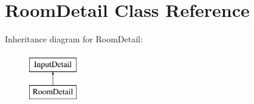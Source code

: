\hypertarget{classRoomDetail}{\section{Room\-Detail Class Reference}
\label{classRoomDetail}
}
Inheritance diagram for Room\-Detail\-:\begin{figure}[H]
\begin{center}
\leavevmode
\includegraphics[height=2.000000cm]{d4/de5/classRoomDetail}
\end{center}
\end{figure}
